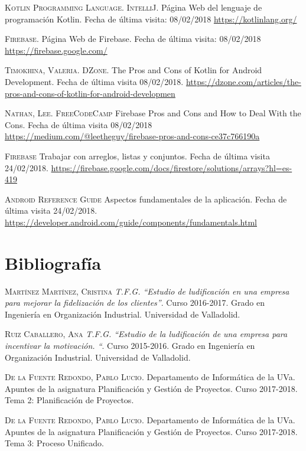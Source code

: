 \documentclass[twoside]{report}
\begin{document}
\begin{thebibliography}{a}
 \textsc{Kotlin Programming Language. IntelliJ}. Página Web del lenguaje de programación Kotlin. Fecha de última visita: 08/02/2018 \url{https://kotlinlang.org/}

 \textsc{Firebase}. Página Web de Firebase. Fecha de última visita: 08/02/2018 \url{https://firebase.google.com/}

 \textsc{Timokhina, Valeria. DZone}. The Pros and Cons of Kotlin for Android Development. Fecha de última visita 08/02/2018. \url{https://dzone.com/articles/the-pros-and-cons-of-kotlin-for-android-developmen}

 \textsc{Nathan, Lee. FreeCodeCamp} Firebase Pros and Cons and How to Deal With the Cons. Fecha de última visita 08/02/2018 \url{https://medium.com/@leetheguy/firebase-pros-and-cons-ce37c766190a}

 \textsc{Firebase} Trabajar con arreglos, listas y conjuntos. Fecha de última visita 24/02/2018.  \url{https://firebase.google.com/docs/firestore/solutions/arrays?hl=es-419}

 \textsc{Android Reference Guide} Aspectos fundamentales de la aplicación. Fecha de última visita 24/02/2018. \url{https://developer.android.com/guide/components/fundamentals.html}



\section{Bibliografía}

 \textsc{Martínez Martínez, Cristina} \textit{T.F.G. “Estudio de ludificación en una empresa para mejorar la fidelización de los clientes”}. Curso 2016-2017. Grado en Ingeniería en Organización Industrial. Universidad de Valladolid. 

 \textsc{Ruiz Caballero, Ana} \textit{T.F.G. “Estudio de la ludificación de una empresa para incentivar la motivación. “}. Curso 2015-2016. Grado en Ingeniería en Organización Industrial. Universidad de Valladolid. 


 \textsc{De la Fuente Redondo, Pablo Lucio}. Departamento de Informática de la UVa. Apuntes de la asignatura Planificación y Gestión de Proyectos. Curso 2017-2018. Tema 2: Planificación de Proyectos.

 \textsc{De la Fuente Redondo, Pablo Lucio}. Departamento de Informática de la UVa. Apuntes de la asignatura Planificación y Gestión de Proyectos. Curso 2017-2018. Tema 3: Proceso Unificado.



\end{thebibliography}
\end{document}

